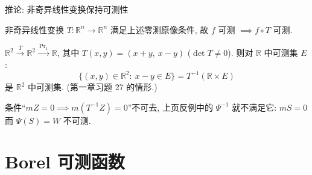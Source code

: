 
\begin{frame}{推论: 非奇异线性变换保持可测性}

\begin{cor}
非奇异线性变换 $T: \mathbb{R}^n \to \mathbb{R}^n$ 满足上述零测原像条件, 故 $f$ 可测
$\implies f \circ T$ 可测.
\end{cor}

\pause

\begin{eg}
$\mathbb{R}^2 \xrightarrow{\ T\ } \mathbb{R}^2 \xrightarrow{\ \mathrm{Pr}_1\ } \mathbb{R}$,
其中 $T(x, y) = (x + y,\ x - y)$ ($\det T \neq 0$). 则对 $\mathbb{R}$ 中可测集 $E$:
\[
\{(x, y) \in \mathbb{R}^2:\ x - y \in E\} = T^{-1}(\mathbb{R} \times E)
\]
是 $\mathbb{R}^2$ 中可测集. (第一章习题 27 的情形.)
\end{eg}

\pause

\begin{remark}
条件``$mZ = 0 \implies m(T^{-1}Z) = 0$''不可去, 上页反例中的 $\Psi^{-1}$ 就\alert{不满足}它:
$mS = 0$ 而 $\Psi(S) = W$ 不可测.
\end{remark}

\end{frame}


\section[Borel 可测]{Borel 可测函数}


